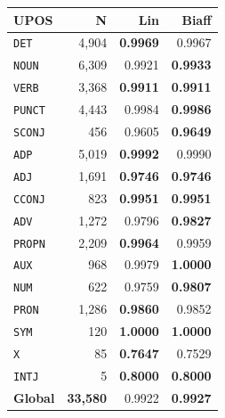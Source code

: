 \begin{table}[ht]
\begin{minipage}[t]{0.60\linewidth}
\begin{tabular}{l r  r r r r}
\bottomrule
\end{tabular}
\end{minipage}
\hfill
\begin{minipage}[t]{0.37\linewidth}
\centering
\begin{tabular}{l r  r r}
\toprule
\textbf{UPOS} & \textbf{N} & \textbf{Lin} & \textbf{Biaff} \\
\midrule
\texttt{DET} & 4,904 & \textbf{0.9969} & 0.9967 \\
\texttt{NOUN} & 6,309 & 0.9921 & \textbf{0.9933} \\
\texttt{VERB} & 3,368 & \textbf{0.9911} & \textbf{0.9911} \\
\texttt{PUNCT} & 4,443 & 0.9984 & \textbf{0.9986} \\
\texttt{SCONJ} & 456 & 0.9605 & \textbf{0.9649} \\
\texttt{ADP} & 5,019 & \textbf{0.9992} & 0.9990 \\
\texttt{ADJ} & 1,691 & \textbf{0.9746} & \textbf{0.9746} \\
\texttt{CCONJ} & 823 & \textbf{0.9951} & \textbf{0.9951} \\
\texttt{ADV} & 1,272 & 0.9796 & \textbf{0.9827} \\
\texttt{PROPN} & 2,209 & \textbf{0.9964} & 0.9959 \\
\texttt{AUX} & 968 & 0.9979 & \textbf{1.0000} \\
\texttt{NUM} & 622 & 0.9759 & \textbf{0.9807} \\
\texttt{PRON} & 1,286 & \textbf{0.9860} & 0.9852 \\
\texttt{SYM} & 120 & \textbf{1.0000} & \textbf{1.0000} \\
\texttt{X} & 85 & \textbf{0.7647} & 0.7529 \\
\texttt{INTJ} & 5 & \textbf{0.8000} & \textbf{0.8000} \\
\midrule
\textbf{Global} & \textbf{33,580} & 0.9922 & \textbf{0.9927} \\
\bottomrule
\end{tabular}
\end{minipage}
\end{table}


